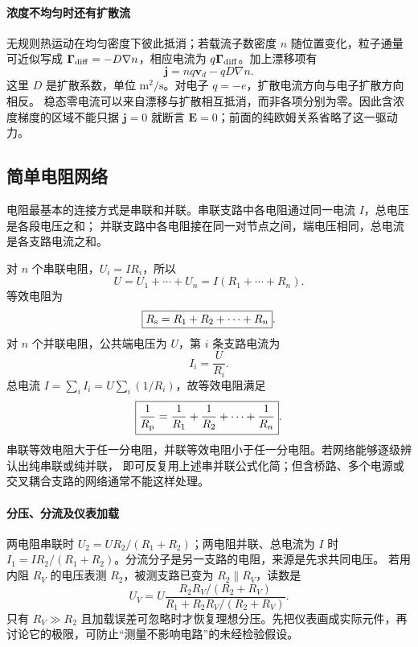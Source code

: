 \paragraph{浓度不均匀时还有扩散流}
无规则热运动在均匀密度下彼此抵消；若载流子数密度 $n$ 随位置变化，粒子通量可近似写成
$\boldsymbol\Gamma_{\rm diff}=-D\nabla n$，相应电流为 $q\boldsymbol\Gamma_{\rm diff}$。加上漂移项有
\[
 \boldsymbol j=nq\boldsymbol v_d-qD\nabla n.
\]
这里 $D$ 是扩散系数，单位 $\mathrm{m^2/s}$。对电子 $q=-e$，扩散电流方向与电子扩散方向相反。
稳态零电流可以来自漂移与扩散相互抵消，而非各项分别为零。因此含浓度梯度的区域不能只据 $\boldsymbol j=0$ 就断言 $\boldsymbol E=0$；前面的纯欧姆关系省略了这一驱动力。

\subsection*{简单电阻网络}

电阻最基本的连接方式是串联和并联。串联支路中各电阻通过同一电流 $I$，总电压是各段电压之和；
并联支路中各电阻接在同一对节点之间，端电压相同，总电流是各支路电流之和。

\seriesParallelResistorsFigure
{}

对 $n$ 个串联电阻，$U_i=IR_i$，所以
\[
  U=U_1+\cdots+U_n=I(R_1+\cdots+R_n).
\]
等效电阻为
\begin{equation}
  \boxed{R_{\rm s}=R_1+R_2+\cdots+R_n}.
\end{equation}
对 $n$ 个并联电阻，公共端电压为 $U$，第 $i$ 条支路电流为
\begin{equation}
  \boxed{I_i=\frac{U}{R_i}}.
\end{equation}
总电流
$I=\sum_i I_i=U\sum_i(1/R_i)$，故等效电阻满足
\begin{equation}
  \boxed{\frac1{R_{\rm p}}=\frac1{R_1}+\frac1{R_2}+\cdots+\frac1{R_n}}.
\end{equation}
串联等效电阻大于任一分电阻，并联等效电阻小于任一分电阻。若网络能够逐级辨认出纯串联或纯并联，
即可反复用上述串并联公式化简；但含桥路、多个电源或交叉耦合支路的网络通常不能这样处理。


\paragraph{分压、分流及仪表加载}
两电阻串联时 $U_2=UR_2/(R_1+R_2)$；两电阻并联、总电流为 $I$ 时 $I_1=IR_2/(R_1+R_2)$。分流分子是另一支路的电阻，来源是先求共同电压。
若用内阻 $R_V$ 的电压表测 $R_2$，被测支路已变为 $R_2\parallel R_V$，读数是
\[
 U_V=U\frac{R_2R_V/(R_2+R_V)}{R_1+R_2R_V/(R_2+R_V)}.
\]
只有 $R_V\gg R_2$ 且加载误差可忽略时才恢复理想分压。先把仪表画成实际元件，再讨论它的极限，可防止“测量不影响电路”的未经检验假设。


